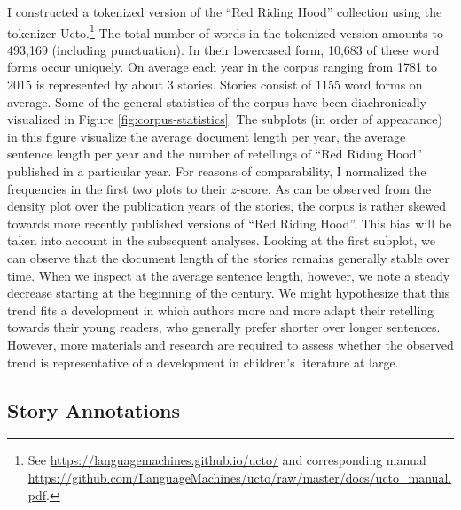 I constructed a tokenized version of the ``Red Riding Hood'' collection using the tokenizer Ucto.\footnote{See \url{https://languagemachines.github.io/ucto/} and corresponding manual \url{https://github.com/LanguageMachines/ucto/raw/master/docs/ucto_manual.pdf}.} The total number of words in the tokenized version amounts to 493,169 (including punctuation). In their lowercased form, 10,683 of these word forms occur uniquely. On average each year in the corpus ranging from 1781 to 2015 is represented by about 3 stories. Stories consist of 1155 word forms on average. Some of the general statistics of the corpus have been diachronically visualized in Figure \ref{fig:corpus-statistics}. The subplots (in order of appearance) in this figure visualize the average document length per year, the average sentence length per year and the number of retellings of ``Red Riding Hood'' published in a particular year. For reasons of comparability, I normalized the frequencies in the first two plots to their $z$-score. As can be observed from the density plot over the publication years of the stories, the corpus is rather skewed towards more recently published versions of ``Red Riding Hood''. This bias will be taken into account in the subsequent analyses. Looking at the first subplot, we can observe that the document length of the stories remains generally stable over time. When we inspect at the average sentence length, however, we note a steady decrease starting at the beginning of the  century. We might hypothesize that this trend fits a development in which authors more and more adapt their retelling towards their young readers, who generally prefer shorter over longer sentences. However, more materials and research are required to assess whether the observed trend is representative of a development in children's literature at large. 

\subsection{Story Annotations}\label{sec:annotations}

